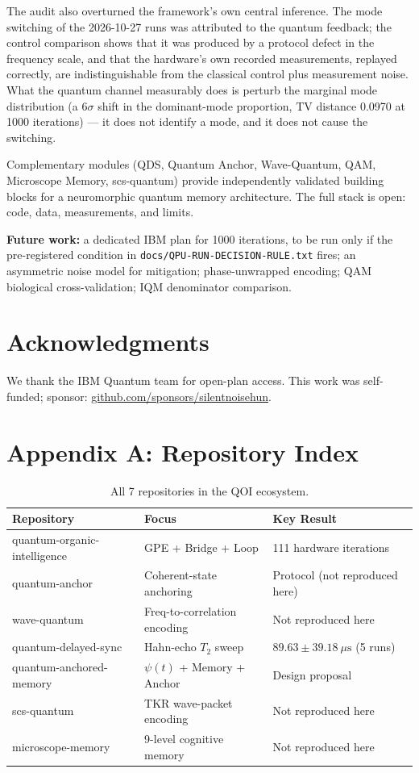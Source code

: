 \documentclass[sigconf,anonymous=false]{acmart}
\begin{document}
The audit also overturned the framework's own central inference. The mode switching of the
2026-10-27 runs was attributed to the quantum feedback; the control comparison shows that it
was produced by a protocol defect in the frequency scale, and that the hardware's own
recorded measurements, replayed correctly, are indistinguishable from the classical control
plus measurement noise. What the quantum channel measurably does is perturb the marginal
mode distribution (a $6\sigma$ shift in the dominant-mode proportion, TV distance 0.0970 at
1000 iterations) --- it does not identify a mode, and it does not cause the switching.

Complementary modules (QDS, Quantum Anchor, Wave-Quantum, QAM, Microscope Memory, scs-quantum) provide independently validated building blocks for a neuromorphic quantum memory architecture. The full stack is open: code, data, measurements, and limits.

\textbf{Future work:} a dedicated IBM plan for 1000 iterations, to be run only if the
pre-registered condition in \texttt{docs/QPU-RUN-DECISION-RULE.txt} fires; an asymmetric noise
model for mitigation; phase-unwrapped encoding; QAM biological cross-validation; IQM denominator comparison.

\section*{Acknowledgments}

We thank the IBM Quantum team for open-plan access. This work was self-funded; sponsor: \url{github.com/sponsors/silentnoisehun}.




\appendix

\section{Appendix A: Repository Index}

\begin{table}[h]
\centering
\caption{All 7 repositories in the QOI ecosystem.}
\label{tab:repos}
\begin{tabular}{lll}
\toprule
Repository & Focus & Key Result \\
\midrule
quantum-organic-intelligence & GPE + Bridge + Loop & 111 hardware iterations \\
quantum-anchor & Coherent-state anchoring & Protocol (not reproduced here) \\
wave-quantum & Freq-to-correlation encoding & Not reproduced here \\
quantum-delayed-sync & Hahn-echo $T_2$ sweep & $89.63 \pm 39.18\ \mu\text{s}$ (5 runs) \\
quantum-anchored-memory & $\psi(t)$ + Memory + Anchor & Design proposal \\
scs-quantum & TKR wave-packet encoding & Not reproduced here \\
microscope-memory & 9-level cognitive memory & Not reproduced here \\
\bottomrule
\end{tabular}
\end{table}
\end{document}
